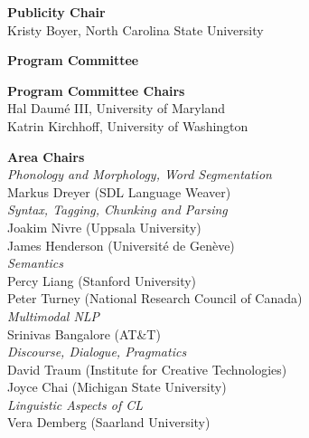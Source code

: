 \vspace{3mm}
{\bf Publicity Chair}\vspace{2mm} \\
Kristy Boyer, North Carolina State University

\vspace*{1cm}

 {\Large \bf Program Committee}

{\bf Program Committee Chairs}\vspace{2mm} \\
Hal Daumé III, University of Maryland \\
Katrin Kirchhoff, University of Washington

\vspace{3mm}
{\bf Area Chairs}\vspace{2mm} \\
\emph{Phonology and Morphology, Word Segmentation} \\
\hspace*{5mm} Markus Dreyer (SDL Language Weaver) \\
%
\emph{Syntax, Tagging, Chunking and Parsing}	\\
\hspace*{5mm} Joakim Nivre (Uppsala University) \\
\hspace*{5mm} James Henderson (Université de Genève) \\
%
\emph{Semantics}	\\
\hspace*{5mm} Percy Liang (Stanford University) \\
\hspace*{5mm} Peter Turney (National Research Council of Canada) \\
%
\emph{Multimodal NLP} \\
\hspace*{5mm} Srinivas Bangalore (AT\&T) \\
%
\emph{Discourse, Dialogue, Pragmatics}	\\
\hspace*{5mm} David Traum (Institute for Creative Technologies) \\
\hspace*{5mm} Joyce Chai (Michigan State University) \\
%
\emph{Linguistic Aspects of CL} \\
\hspace*{5mm} Vera Demberg (Saarland University) \\
